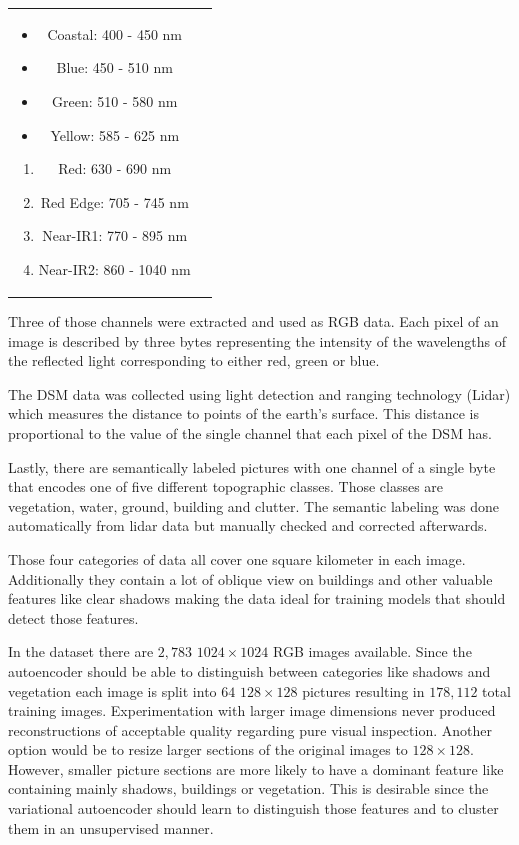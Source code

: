 \begin{tabular} {c c}
    \parbox{5cm}{
        \begin{itemize}
            \item Coastal: 400 - 450 nm 			
            \item Blue: 450 - 510 nm			
            \item Green: 510 - 580 nm 			
            \item Yellow: 585 - 625 nm
        \end{itemize}
    }
    \parbox{5cm}{
        \begin{enumerate} 			
            \item Red: 630 - 690 nm
            \item Red Edge: 705 - 745 nm
            \item Near-IR1: 770 - 895 nm
            \item Near-IR2: 860 - 1040 nm
        \end{enumerate}
    }
\end{tabular}
\bigskip

Three of those channels were extracted and used as RGB data. 
Each pixel of an image is described by three bytes representing the intensity of the wavelengths of the 
reflected light corresponding to either red, green or blue.

The DSM data was collected using light detection and ranging technology (Lidar) which measures the 
distance to points of the earth's surface. This distance is proportional to the value of the single channel
that each pixel of the DSM has.

Lastly, there are semantically labeled pictures with one channel of a single byte that encodes one of five 
different topographic classes. Those classes are vegetation, water, ground, building and clutter. 
The semantic labeling was done automatically from lidar data but manually checked and corrected afterwards.

Those four categories of data all cover one square kilometer in each image.
Additionally they contain a lot of oblique view on buildings and other valuable
features like clear shadows making the data ideal for training models that should 
detect those features.

In the dataset there are $2,783$ $1024\times 1024$ RGB images available. Since the autoencoder should
be able to distinguish between categories like shadows and vegetation each image is split into $64$
$128\times 128$ pictures resulting in $178,112$ total training images. 
Experimentation with larger image dimensions never produced reconstructions of acceptable
quality regarding pure visual inspection.
Another option would be to resize larger sections of the original images to $128\times 128$. However,
smaller picture sections
are more likely to have a dominant feature like containing mainly shadows, buildings or vegetation.
This is desirable since the variational autoencoder should learn to distinguish those features and to cluster
them in an unsupervised manner.


